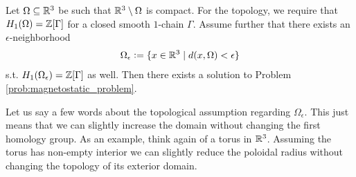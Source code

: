 \documentclass[../master_thesis.tex]{subfiles}
\begin{document}
\begin{theorem}\label{thm:existence}
    Let $\Omega \subseteq \mathbb{R}^3$ be such that $\mathbb{R}^3 \setminus \Omega$
    is compact. 
    For the topology, we require that $H_1(\Omega) = \mathbb{Z} [\Gamma]$ 
    for a closed smooth $1$-chain 
    $\Gamma$. Assume further that there exists an $\epsilon$-neighborhood 
    \begin{align*}
        \Omega_\epsilon \vcentcolon= \{ x \in \mathbb{R}^3 \mid
            d(x,\Omega) < \epsilon \} 
    \end{align*}
    s.t. $H_1(\Omega_\epsilon) = \mathbb{Z} [\Gamma]$ as well.
    Then there exists a solution 
    to Problem \ref{prob:magnetostatic_problem}.
\end{theorem}
Let us say a few words about the topological assumption 
regarding $\Omega_\epsilon$. This just means that we can slightly increase 
the domain without changing the first homology group. As an example, 
think again of a torus in $\mathbb{R}^3$. Assuming the torus has non-empty interior 
we can slightly reduce the poloidal radius without changing the topology of its 
 exterior domain.
\end{document}
